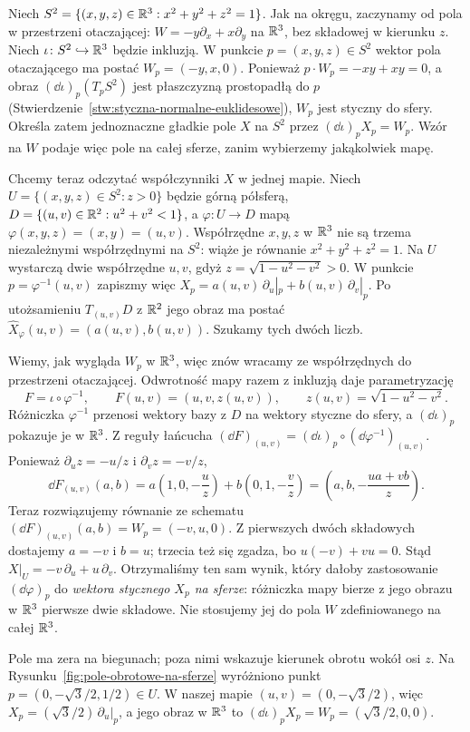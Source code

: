 \begin{przyklad}
Niech $S^2=\{(x,y,z)\in\mathbb{R}^3:x^2+y^2+z^2=1\}$.
Jak na okręgu, zaczynamy od pola w przestrzeni otaczającej:
$W=-y\partial_x+x\partial_y$ na $\mathbb{R}^3$, bez składowej
w kierunku $z$. Niech $\iota\colon S^2\hookrightarrow\mathbb{R}^3$
będzie inkluzją. W punkcie $p=(x,y,z)\in S^2$ wektor pola
otaczającego ma postać $W_p=(-y,x,0)$. Ponieważ
$p\cdot W_p=-xy+xy=0$, a obraz $(\dd\iota)_p(T_pS^2)$
jest płaszczyzną prostopadłą do $p$
(Stwierdzenie~\ref{stw:styczna-normalne-euklidesowe}),
$W_p$ jest styczny
do sfery. Określa zatem jednoznaczne gładkie pole $X$ na
$S^2$ przez $(\dd\iota)_pX_p=W_p$. Wzór na $W$ podaje
więc pole na całej sferze, zanim wybierzemy jakąkolwiek mapę.

Chcemy teraz odczytać współczynniki $X$ w jednej mapie.
Niech $U=\{(x,y,z)\in S^2:z>0\}$ będzie górną półsferą,
$D=\{(u,v)\in\mathbb{R}^2:u^2+v^2<1\}$, a
$\varphi\colon U\to D$ mapą $\varphi(x,y,z)=(x,y)=(u,v)$.
Współrzędne $x,y,z$ w $\mathbb{R}^3$ nie są trzema niezależnymi
współrzędnymi na $S^2$: wiąże je równanie $x^2+y^2+z^2=1$.
Na $U$ wystarczą dwie współrzędne $u,v$, gdyż
$z=\sqrt{1-u^2-v^2}>0$. W punkcie
$p=\varphi^{-1}(u,v)$ zapiszmy więc
$X_p=a(u,v)\,\partial_u|_p+b(u,v)\,\partial_v|_p$.
Po utożsamieniu $T_{(u,v)}D$ z $\mathbb{R}^2$ jego obraz ma postać
$\widehat X_\varphi(u,v)=(a(u,v),b(u,v))$.
Szukamy tych dwóch liczb.

Wiemy, jak wygląda $W_p$ w $\mathbb{R}^3$, więc znów wracamy ze
współrzędnych do przestrzeni otaczającej. Odwrotność mapy
razem z inkluzją daje parametryzację
\[
F=\iota\circ\varphi^{-1},\qquad
F(u,v)=(u,v,z(u,v)),\qquad
z(u,v)=\sqrt{1-u^2-v^2}.
\]
Różniczka $\varphi^{-1}$ przenosi wektory bazy z $D$
na wektory styczne do sfery, a $(\dd\iota)_p$ pokazuje je
w $\mathbb{R}^3$. Z reguły łańcucha
$(\dd F)_{(u,v)}=(\dd\iota)_p\circ(\dd\varphi^{-1})_{(u,v)}$.
Ponieważ $\partial_u z=-u/z$ i $\partial_v z=-v/z$,
\[
\dd F_{(u,v)}(a,b)
=a\left(1,0,-\frac{u}{z}\right)
 +b\left(0,1,-\frac{v}{z}\right)
=\left(a,b,-\frac{ua+vb}{z}\right).
\]
Teraz rozwiązujemy równanie ze schematu
$(\dd F)_{(u,v)}(a,b)=W_p=(-v,u,0)$.
Z pierwszych dwóch składowych dostajemy $a=-v$ i $b=u$;
trzecia też się zgadza, bo $u(-v)+vu=0$.
Stąd $X|_U=-v\,\partial_u+u\,\partial_v$.
Otrzymaliśmy ten sam wynik, który dałoby zastosowanie
$(\dd\varphi)_p$ do \emph{wektora stycznego $X_p$ na sferze}:
różniczka mapy bierze z jego obrazu w $\mathbb{R}^3$ pierwsze
dwie składowe. Nie stosujemy jej do pola $W$ zdefiniowanego
na całej $\mathbb{R}^3$.

Pole ma zera na biegunach; poza nimi wskazuje kierunek obrotu
wokół osi $z$. Na Rysunku~\ref{fig:pole-obrotowe-na-sferze}
wyróżniono punkt $p=(0,-\sqrt3/2,1/2)\in U$.
W naszej mapie $(u,v)=(0,-\sqrt3/2)$, więc
$X_p=(\sqrt3/2)\,\partial_u|_p$, a jego obraz w $\mathbb{R}^3$ to
$(\dd\iota)_pX_p=W_p=(\sqrt3/2,0,0)$.
\end{przyklad}

